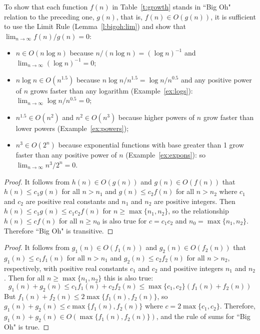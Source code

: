 To show that each function \(f(n)\) in Table~\ref{t:growth} stands in ``Big Oh" relation to the preceding one, $g(n)$,
that is, $f(n) \in O(g(n))$, it is sufficient to use the Limit Rule (Lemma~\ref{l:bigoh:lim}) and 
show that $\lim_{n\rightarrow\infty}f(n) / g(n) = 0$:
\begin{itemize}
\item[] \hspace*{-10mm} $n \in O(n\log{n})$ because 
$n/(n\log n) = (\log n)^{-1}$ and $\lim_{n\rightarrow\infty} (\log n)^{-1} = 0$;
\item[] \hspace*{-10mm} $n\log{n} \in O(n^{1.5})$ because $n\log{n} / n^{1.5} = \log n / n^{0.5}$ 
and any positive power of $n$ grows faster than any 
logarithm (Example~\ref{ex:logs}): \(\lim_{n\rightarrow\infty}\log{n} / n^{0.5} = 0\);
\item[] \hspace*{-10mm} $n^{1.5} \in O(n^2)$ and  $n^2 \in O(n^3)$ because higher powers of  $n$
grow faster than lower powers (Example~\ref{ex:powers}); 
\item[] \hspace*{-10mm} $n^3 \in O(2^n)$ because exponential functions with base greater than 1 
grow faster than any positive power of \(n\) (Example~\ref{ex:expons}):
so \(\lim_{n\rightarrow\infty}n^3/2^n = 0\).
\end{itemize}

\begin{proof}
It follows from $h(n) \in O(g(n))$ and 
$g(n) \in O(f(n))$ that $h(n) \leq c_1g(n)$ for all $n > n_1$ and
$g(n) \leq c_2f(n)$ for all $n > n_2$ where $c_1$ and $c_2$ are 
positive real constants and
$n_1$ and $n_2$ are positive integers. 
Then $h(n) \leq c_1g(n) \leq c_1 c_2 f (n)$
for $n \geq \max\{n_1,n_2\}$,
so the relationship $h(n) \leq cf(n)$ for all $n \geq n_0$ is also true
for $c = c_1c_2$ and $n_0 = \max\{n_1,n_2\}$. 
Therefore ``Big Oh" is transitive.
\end{proof}

\begin{proof}
It follows from $g_1(n) \in O(f_1(n))$ and $g_2(n) \in O(f_2(n))$ that 
$g_1(n) \leq c_1f_1(n)$ for all $n > n_1$ and
$g_2(n) \leq c_2f_2(n)$ for all $n > n_2$, respectively, with 
positive real constants  $c_1$ and $c_2$ and positive integers
$n_1$ and $n_2$. Then for all $n \geq \max\{n_1,n_2\}$ 
this is also true: 
\[
g_1(n) + g_2(n) \leq c_1f_1(n)  + c_2f_2(n) \leq \max\{c_1,c_2\}\left(f_1(n)+f_2(n)\right)
\] 
But 
$f_1(n)+f_2(n)\leq 2\max\{f_1(n),f_2(n)\}$, so 
$g_1(n)+g_2(n)\leq c\max\{f_1(n),f_2(n)\}$ where $c = 2\max\{c_1,c_2\}$.
Therefore, $g_1(n)+g_2(n) \in O(\max\{f_1(n),f_2(n)\})$, and  the rule of sums for ``Big Oh" is true.
\end{proof}

